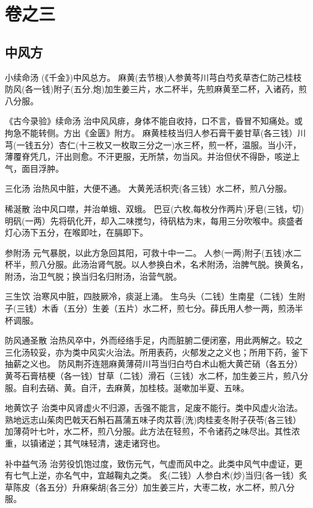 \documentclass[a4paper,12pt,UTF8,twoside]{ctexbook}
\begin{document}
    
    
    \chapter{卷之三}
    \section{中风方}
    	
    
    小续命汤
    (《千金》)中风总方。
    麻黄(去节根)人参黄芩川芎白芍炙草杏仁防己桂枝防风(各一钱)附子(五分,炮)加生姜三片，水二杯半，先煎麻黄至二杯，入诸药，煎八分服。
    
    《古今录验》续命汤
    治中风风痱，身体不能自收持，口不言，昏冒不知痛处。或拘急不能转侧。方出《金匮》附方。
    麻黄桂枝当归人参石膏干姜甘草(各三钱）川芎(一钱五分）杏仁(十三枚又一枚取三分之一)水三杯，煎一杯，温服。当小汗，薄覆脊凭几，汗出则愈。不汗更服，无所禁，勿当风。并治但伏不得卧，咳逆上气，面目浮肿。
    
    三化汤
    治热风中脏，大便不通。
    大黄羌活枳壳(各三钱）水二杯，煎八分服。
    
    稀涎散
    治中风口噤，并治单蛾、双蛾。
    巴豆(六枚,每枚分作两片)牙皂(三钱，切)明矾(一两）先将矾化开，却入二味搅匀，待矾枯为末，每用三分吹喉中。痰盛者灯心汤下五分，在喉即吐，在膈即下。
    
    参附汤
    元气暴脱，以此方急回其阳，可救十中一二。
    人参(一两)附子(五钱)水二杯半，煎八分服。此汤治肾气脱。以人参换白术，名术附汤，治脾气脱。换黄名，附汤，治卫气脱；换当归名归附汤，治营气脱。
    
    三生饮
    治寒风中脏，四肢厥冷，痰涎上涌。
    生乌头（二钱）生南星（二钱）生附子(三钱）木香（五分）生姜（五片）水二杯，煎七分。薛氏用人参一两，煎汤半杯调服。
    
    防风通圣散
    治热风卒中，外而经络手足，内而脏腑二便闭塞，用此两解之。较之三化汤较妥，亦为类中风实火治法。所用表药，火郁发之之义也；所用下药，釜下抽薪之义也。
    防风荆芥连翘麻黄薄荷川芎当归白芍白术山栀大黄芒硝（各五分）黄芩石膏桔梗（各一钱）甘草（二钱）滑石（三钱）水二杯，加生姜三片，煎八分服。自利去硝、黄。自汗，去麻黄，加桂枝。涎嗽加半夏、五味。
    
    地黄饮子
    治类中风肾虚火不归源，舌强不能言，足废不能行。类中风虚火治法。
    熟地远志山茱肉巴戟天石斛石菖蒲五味子肉苁蓉(洗)肉桂麦冬附子茯苓(各三钱）加薄荷叶七叶，水二杯，煎八分服。此方法在轻煎，不令诸药之味尽出。其性浓重，以镇诸逆；其气味轻清，速走诸窍也。
    
    补中益气汤
    治劳役饥饱过度，致伤元气，气虚而风中之。此类中风气中虚证，更有七气上逆，亦名气中，宜越鞠丸之类。
    炙(二钱）人参白术(炒)当归(各一钱）炙草陈皮（各五分）升麻柴胡(各三分）加生姜三片，大枣二枚，水二杯，煎八分服。
    
\end{document}
